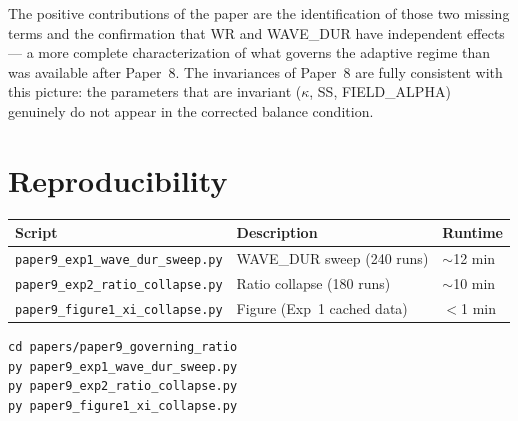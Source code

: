 \documentclass[11pt]{article}
\theoremstyle{remark}
\begin{document}
The positive contributions of the paper are the identification of those two
missing terms and the confirmation that WR and WAVE\_DUR have independent effects
--- a more complete characterization of what governs the adaptive regime than
was available after Paper~8. The invariances of Paper~8 are fully consistent
with this picture: the parameters that are invariant ($\kappa$, SS, FIELD\_ALPHA)
genuinely do not appear in the corrected balance condition.

\appendix
\section{Reproducibility}

\begin{center}
\begin{tabular}{lll}
\toprule
Script & Description & Runtime \\
\midrule
\texttt{paper9\_exp1\_wave\_dur\_sweep.py} & WAVE\_DUR sweep (240 runs) & $\sim$12 min \\
\texttt{paper9\_exp2\_ratio\_collapse.py}  & Ratio collapse (180 runs)  & $\sim$10 min \\
\texttt{paper9\_figure1\_xi\_collapse.py}  & Figure (Exp~1 cached data) & $<$1 min \\
\bottomrule
\end{tabular}
\end{center}

\begin{lstlisting}[caption={Run experiments and generate figure.}]
cd papers/paper9_governing_ratio
py paper9_exp1_wave_dur_sweep.py
py paper9_exp2_ratio_collapse.py
py paper9_figure1_xi_collapse.py
\end{lstlisting}
\end{document}
